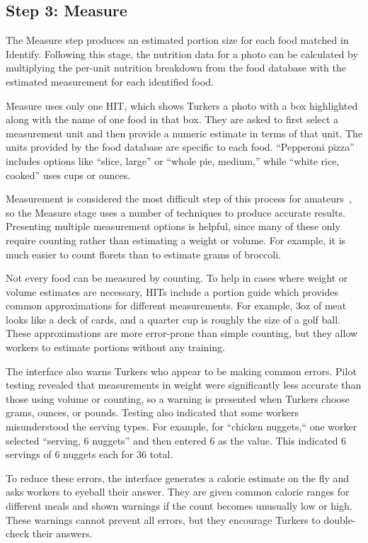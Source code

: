 \subsection{Step 3: Measure}

The Measure step produces an estimated portion size for each food
matched in Identify. Following this stage, the nutrition data for a
photo can be calculated by multiplying the per-unit nutrition
breakdown from the food database with the estimated measurement for
each identified food.

Measure uses only one HIT, which shows Turkers a photo with a box
highlighted along with the name of one food in that box. They are
asked to first select a measurement unit and then provide a numeric
estimate in terms of that unit. The units provided by the food
database are specific to each food. ``Pepperoni pizza'' includes
options like ``slice, large'' or ``whole pie, medium,'' while ``white
rice, cooked'' uses cups or ounces.

Measurement is considered the most difficult step of this process for
amateurs~\cite{martin2009novel}, so the Measure stage uses a number of
techniques to produce accurate results. Presenting multiple
measurement options is helpful, since many of these only require
counting rather than estimating a weight or volume. For example, it is
much easier to count florets than to estimate grams of broccoli.

Not every food can be measured by counting.  To help in cases where
weight or volume estimates are necessary, HITs include a portion guide
which provides common approximations for different measurements. For
example, 3oz of meat looks like a deck of cards, and a quarter cup is
roughly the size of a golf ball. These approximations are more
error-prone than simple counting, but they allow workers to estimate
portions without any training.

The interface also warns Turkers who appear to be making common
errors.  Pilot testing revealed that measurements in weight were
significantly less accurate than those using volume or counting, so a
warning is presented when Turkers choose grams, ounces, or
pounds. Testing also indicated that some workers misunderstood the
serving types.  For example, for ``chicken nuggets,`` one worker
selected ``serving, 6 nuggets'' and then entered 6 as the value. This
indicated 6 servings of 6 nuggets each for 36 total.

To reduce these errors, the interface generates a calorie estimate on
the fly and asks workers to eyeball their answer. They are given
common calorie ranges for different meals and shown warnings if the
count becomes unusually low or high. These warnings cannot prevent all
errors, but they encourage Turkers to double-check their answers.

